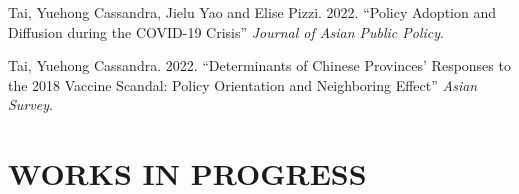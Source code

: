 \documentclass[10.5pt,]{article}
\providecommand{\tightlist}{%
	\setlength{\itemsep}{0pt}\setlength{\parskip}{0pt}}
\renewenvironment{itemize}{
	\begin{list}{}{
			\setlength{\leftmargin}{1.5em}
		}
	}{
	\end{list}
}
\begin{document}
\begin{itemize}
  \begin{itemize}
  \tightlist
  \item
    Tai, Yuehong Cassandra, Jielu Yao and Elise Pizzi. 2022. ``Policy
    Adoption and Diffusion during the COVID-19 Crisis'' \emph{Journal of
    Asian Public Policy}.
  \item
    Tai, Yuehong Cassandra. 2022. ``Determinants of Chinese Provinces'
    Responses to the 2018 Vaccine Scandal: Policy Orientation and
    Neighboring Effect'' \emph{Asian Survey}.
  \end{itemize}
\end{itemize}

\section{WORKS IN PROGRESS}\label{works-in-progress}
\end{document}
